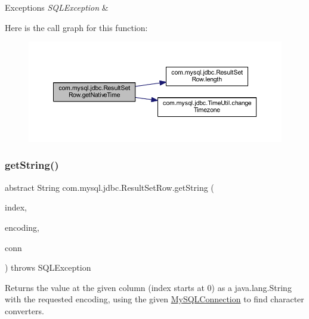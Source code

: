 \begin{DoxyExceptions}{Exceptions}
{\em S\+Q\+L\+Exception} & \\
\hline
\end{DoxyExceptions}
Here is the call graph for this function\+:
\nopagebreak
\begin{figure}[H]
\begin{center}
\leavevmode
\includegraphics[width=350pt]{classcom_1_1mysql_1_1jdbc_1_1_result_set_row_a658750cc3352c8d7d75b0884b5c28477_cgraph}
\end{center}
\end{figure}
\mbox{\label{classcom_1_1mysql_1_1jdbc_1_1_result_set_row_af2c2012bd344ef5efe874ea994431f65}} 
\subsubsection{\texorpdfstring{get\+String()}{getString()}\hspace{0.1cm}{\footnotesize\ttfamily [1/2]}}
{\footnotesize\ttfamily abstract String com.\+mysql.\+jdbc.\+Result\+Set\+Row.\+get\+String (\begin{DoxyParamCaption}\item[{int}]{index,  }\item[{String}]{encoding,  }\item[{\mbox{\hyperlink{interfacecom_1_1mysql_1_1jdbc_1_1_my_s_q_l_connection}{My\+S\+Q\+L\+Connection}}}]{conn }\end{DoxyParamCaption}) throws S\+Q\+L\+Exception\hspace{0.3cm}{\ttfamily [abstract]}}

Returns the value at the given column (index starts at 0) as a java.\+lang.\+String with the requested encoding, using the given \mbox{\hyperlink{interfacecom_1_1mysql_1_1jdbc_1_1_my_s_q_l_connection}{My\+S\+Q\+L\+Connection}} to find character converters.


